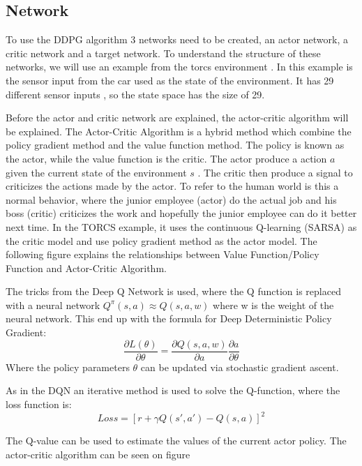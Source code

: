 \subsection{Network}
To use the DDPG algorithm 3 networks need to be created, an actor network, a critic network and a target network. To understand the structure of these networks, we will use an example from the torcs environment \cite{DDPG_Torcs}. In this example is the sensor input from the car used as the state of the environment. It has 29 different sensor inputs \cite{Data_from_Torcs}, so the state space has the size of 29. 

Before the actor and critic network are explained, the actor-critic algorithm will be explained. The Actor-Critic Algorithm is a hybrid method which combine the policy gradient method and the value function method. The policy is known as the actor, while the value function is the critic. The actor produce a action $a$ given the current state of the environment $s$ . The critic then produce a signal to criticizes the actions made by the actor. To refer to the human world is this a normal behavior, where the junior employee (actor) do the actual job and his boss (critic) criticizes the work and hopefully the junior employee can do it better next time. In the TORCS example, it uses the continuous Q-learning (SARSA) as the critic model and use policy gradient method as the actor model. The following figure explains the relationships between Value Function/Policy Function and Actor-Critic Algorithm.    

The tricks from the Deep Q Network is used, where the Q function is replaced with a neural network $Q^\pi(s,a) \approx Q(s,a,w)$ where w is the weight of the neural network. This end up with the formula for Deep Deterministic Policy Gradient:
\begin{equation}
\frac{\partial L(\theta)}{\partial \theta} =\frac{\partial Q(s,a,w)}{\partial a} \frac{\partial a}{\partial \theta}
\end{equation}
Where the policy parameters $\theta$ can be updated via stochastic gradient ascent.

As in the DQN an iterative method is used to solve the Q-function, where the loss function is:
\begin{equation}
Loss = [r + \gamma Q(s',a') - Q(s,a)]^2
\end{equation} 

The Q-value can be used to estimate the values of the current actor policy. The actor-critic algorithm can be seen on figure  

